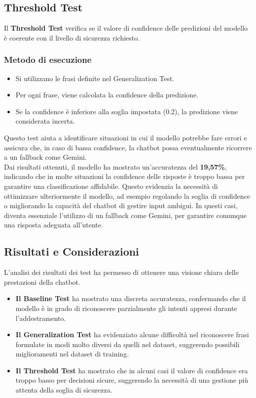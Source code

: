 \documentclass[12pt, letterpaper]{article}
\begin{document}
\subsection{Threshold Test}

Il \textbf{Threshold Test} verifica se il valore di confidence delle predizioni del modello è coerente con il livello di sicurezza richiesto.

\subsubsection{Metodo di esecuzione}
\begin{itemize}
	\item Si utilizzano le frasi definite nel Generalization Test.
	\item Per ogni frase, viene calcolata la confidence della predizione.
	\item Se la confidence è inferiore alla soglia impostata (0.2), la predizione viene considerata incerta.
\end{itemize}
Questo test aiuta a identificare situazioni in cui il modello potrebbe fare errori e assicura che, in caso di bassa confidence, la chatbot possa eventualmente ricorrere a un fallback come Gemini.\\
\newline
Dai risultati ottenuti, il modello ha mostrato un'accuratezza del \textbf{19,57\%}, indicando che in molte situazioni la confidence delle risposte è troppo bassa per garantire una classificazione affidabile. Questo evidenzia la necessità di ottimizzare ulteriormente il modello, ad esempio regolando la soglia di confidence o migliorando la capacità del chatbot di gestire input ambigui. In questi casi, diventa essenziale l’utilizzo di un fallback come Gemini, per garantire comunque una risposta adeguata all’utente.

\subsection{Risultati e Considerazioni}

L’analisi dei risultati dei test ha permesso di ottenere una visione chiara delle prestazioni della chatbot.
\begin{itemize}
	\item \textbf{Il Baseline Test} ha mostrato una discreta accuratezza, confermando che il modello è in grado di riconoscere parzialmente gli intenti appresi durante l’addestramento.
	\item \textbf{Il Generalization Test} ha evidenziato alcune difficoltà nel riconoscere frasi formulate in modi molto diversi da quelli nel dataset, suggerendo possibili miglioramenti nel dataset di training.
	\item \textbf{Il Threshold Test} ha mostrato che in alcuni casi il valore di confidence era troppo basso per decisioni sicure, suggerendo la necessità di una gestione più attenta della soglia di sicurezza.
\end{itemize}
\end{document}
